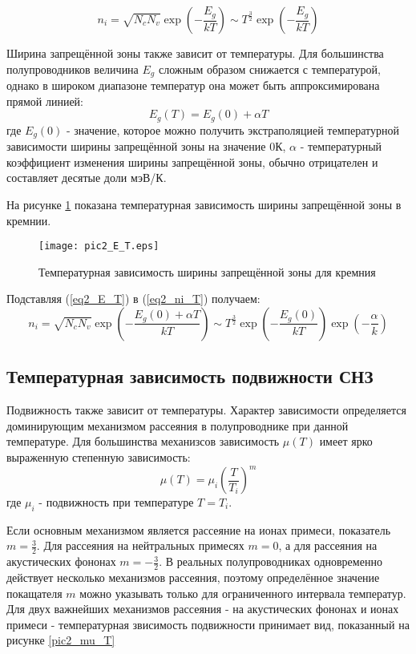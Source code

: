 \begin{equation}
n_{i} = \sqrt{N_{c} N_{v}} \exp{\left( -\frac{E_{g}}{k T} \right)} \sim T^{\frac{3}{2}} \exp{\left( -\frac{E_{g}}{k T} \right)}
\label{eq2_ni_T}
\end{equation}

Ширина запрещённой зоны также зависит от температуры. Для большинства полупроводников величина $E_{g}$ сложным образом снижается с температурой, однако в широком диапазоне температур она может быть аппроксимирована прямой линией:
\begin{equation}
E_{g}(T) = E_{g}(0) + \alpha T
\label{eq2_E_T}
\end{equation}
где $E_{g}(0)$ - значение, которое можно получить экстраполяцией температурной зависимости ширины запрещённой зоны на значение 0\textdegree К, $\alpha$ - температурный коэффициент изменения ширины запрещённой зоны, обычно отрицателен и составляет десятые доли мэВ/К.

На рисунке \ref{pic2_E_T} показана температурная зависимость ширины запрещённой зоны в кремнии.

\begin{figure}[h!]\centering
\texttt{[image: pic2\_E\_T.eps]}
\caption{Температурная зависимость ширины запрещённой зоны для кремния}
\label{pic2_E_T}
\end{figure}

Подставляя (\ref{eq2_E_T}) в (\ref{eq2_ni_T}) получаем:
\begin{equation}
n_{i} = \sqrt{N_{c} N_{v}} \exp{\left( -\frac{E_{g}(0) + \alpha T}{k T} \right)} \sim T^{\frac{3}{2}} \exp{\left( -\frac{E_{g}(0)}{k T} \right)} \exp{\left( -\frac{\alpha}{k} \right)}
\label{eq2_ni_T}
\end{equation}

\subsection{Температурная зависимость подвижности СНЗ}
Подвижность также зависит от температуры. Характер зависимости определяется доминирующим механизмом рассеяния в полупроводнике при данной температуре. Для большинства механизсов зависимость $\mu(T)$ имеет ярко выраженную степенную зависимость:
\begin{equation}
\mu(T) = \mu_{i} \left( \frac{T}{T_{i}} \right)^{m}
\end{equation}
где $\mu_{i}$ - подвижность при температуре $T = T_{i}$.

Если основным механизмом является рассеяние на ионах примеси, показатель $m = \frac{3}{2}$. Для рассеяния на нейтральных примесях $m = 0$, а для рассеяния на акустических фононах $m = -\frac{3}{2}$. В реальных полупроводниках одновременно действует несколько механизмов рассеяния, поэтому определённое значение покащателя $m$ можно указывать только для ограниченного интервала температур. Для двух важнейших механизмов рассеяния - на акустических фононах и ионах примеси - температурная звисимость подвижности принимает вид, показанный на рисунке \ref{pic2_mu_T}

